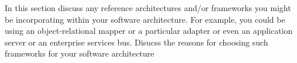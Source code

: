 In this section discuss any reference architectures and/or frameworks you might be incorporating
within your software architecture. For example, you could be using an object-relational mapper or
a particular adapter or even an application server or an enterprise services bus.
Disucss the reasons for choosing such frameworks for your software architecture